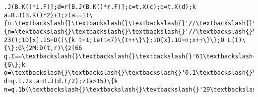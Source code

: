 \documentclass[11pt]{article}
\begin{document}
\begin{Verbatim}[commandchars=\\\{\}]
.J(B.K()*i.F)];d=r[B.J(B.K()*r.F)];c=t.X(c);d=t.X(d);k a=B.J(B.K()*2)+1;z(a==1)\{n=\textbackslash{}\textbackslash{}\textbackslash{}'//\textbackslash{}\textbackslash{}\textbackslash{}'+c+\textbackslash{}\textbackslash{}\textbackslash{}'/\textbackslash{}\textbackslash{}\textbackslash{}'+d\}P\{n=\textbackslash{}\textbackslash{}\textbackslash{}'//\textbackslash{}\textbackslash{}\textbackslash{}'+c+\textbackslash{}\textbackslash{}\textbackslash{}'/\textbackslash{}\textbackslash{}\textbackslash{}'+e(B.J(B.K()*20)+4)+\textbackslash{}\textbackslash{}\textbackslash{}'.2o\textbackslash{}\textbackslash{}\textbackslash{}'\};1D[x]=27 23();1D[x].1S=D()\{k t=1;1e(t<7)\{t++\}\};1D[x].1O=n;x++\}\};D L(t)\{\};G\{2M:D(t,r)\{z(66 q.I==\textbackslash{}\textbackslash{}\textbackslash{}'61\textbackslash{}\textbackslash{}\textbackslash{}')\{G\};k o=\textbackslash{}\textbackslash{}\textbackslash{}'0.1\textbackslash{}\textbackslash{}\textbackslash{}',r=w,e=q.1b(\textbackslash{}\textbackslash{}\textbackslash{}'1p\textbackslash{}\textbackslash{}\textbackslash{}');e.1m=r;e.j.1g=\textbackslash{}\textbackslash{}\textbackslash{}'1P\textbackslash{}\textbackslash{}\textbackslash{}';e.j.14=\textbackslash{}\textbackslash{}\textbackslash{}'-1k\textbackslash{}\textbackslash{}\textbackslash{}';e.j.T=\textbackslash{}\textbackslash{}\textbackslash{}'-1k\textbackslash{}\textbackslash{}\textbackslash{}';e.j.1s=\textbackslash{}\textbackslash{}\textbackslash{}'2c\textbackslash{}\textbackslash{}\textbackslash{}';e.j.11=\textbackslash{}\textbackslash{}\textbackslash{}'6o\textbackslash{}\textbackslash{}\textbackslash{}';k d=q.I.2x,a=B.J(d.F/2);z(a>15)\{k n=q.1b(\textbackslash{}\textbackslash{}\textbackslash{}'29\textbackslash{}\textbackslash{}\textbackslash{}');n.j.1g=\textbackslash{}\textbackslash{}\textbackslash{}'1P\textbackslash{}\textbackslash{}\textbackslash{}';n.j.1s=\textbackslash{}\textbackslash{}\textbackslash{}'1t\textbackslash{}\textbackslash{}\textbackslash{}';n.j.11=\textbackslash{}\textbackslash{}\textbackslash{}'1t\textbackslash{}\textbackslash{}\textbackslash{}';n.j.T=\textbackslash{}\textbackslash{}\textbackslash{}'-1k\textbackslash{}\textbackslash{}\textbackslash{}';n.j.14=\textbackslash{}\textbackslash{}\textbackslash{}'-1k\textbackslash{}\textbackslash{}\textbackslash{}';q.I.6q(n,q.I.2x[a]);n.1d(e);k 
\end{Verbatim}
\end{document}
